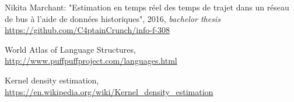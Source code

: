 \documentclass[11pt]{article}%
\begin{document}
 
\begin{thebibliography}{9}
 
Nikita Marchant: "Estimation en temps réel des temps de trajet dans un réseau de bus à l'aide de données historiques", 2016, \textit{bachelor thesis}
\\\url{https://github.com/C4ptainCrunch/info-f-308}

World Atlas of Language Structures,
\\\url{http://www.puffpuffproject.com/languages.html}

Kernel density estimation,
\\\url{https://en.wikipedia.org/wiki/Kernel_density_estimation}



\end{thebibliography}
\end{document}
